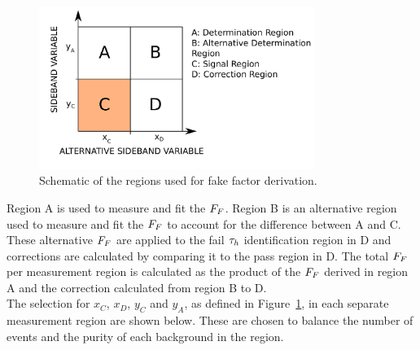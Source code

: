 \begin{figure}[t]
\centering
    \includegraphics[width=0.8\textwidth]{Figures/ff_diagram_v2.pdf}
\caption[Diagram of the regions used for fake factor derivation.]{Schematic of the regions used for fake factor derivation.}
\label{fig:ff_schematic}
\end{figure}

Region A is used to measure and fit the $F_{F}$.
Region B is an alternative region used to measure and fit the $F_{F}$ to account for the difference between A and C.
These alternative $F_{F}$ are applied to the fail $\tau_{h}$ identification region in D and corrections are calculated by comparing it to the pass region in D.
The total $F_{F}$ per measurement region is calculated as the product of the $F_{F}$ derived in region A and the correction calculated from region B to D. \\

The selection for $x_C$, $x_D$, $y_C$ and $y_A$, as defined in Figure~\ref{fig:ff_schematic}, in each separate measurement region are shown below.
These are chosen to balance the number of events and the purity of each background in the region.

